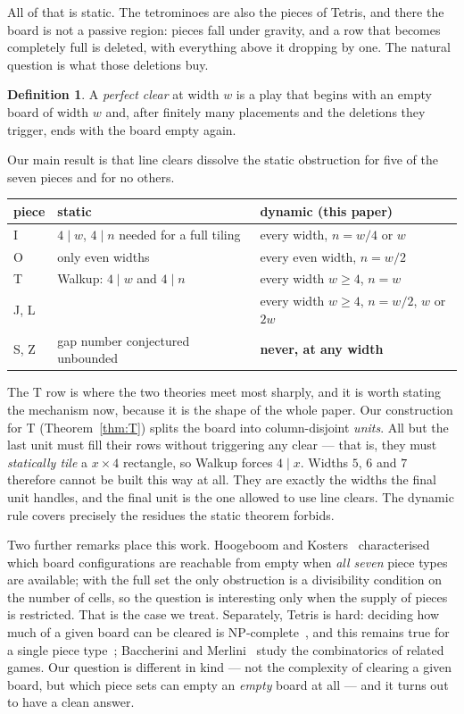 \documentclass[11pt,a4paper]{article}
\theoremstyle{plain}
\theoremstyle{definition}
\newtheorem{definition}[theorem]{Definition}
\theoremstyle{remark}
\begin{document}
All of that is static. The tetrominoes are also the pieces of Tetris, and there the
board is not a passive region: pieces fall under gravity, and a row that becomes
completely full is deleted, with everything above it dropping by one. The natural
question is what those deletions buy.

\begin{definition}
A \emph{perfect clear} at width $w$ is a play that begins with an empty board of
width $w$ and, after finitely many placements and the deletions they trigger, ends
with the board empty again.
\end{definition}

Our main result is that line clears dissolve the static obstruction for five of the
seven pieces and for no others.

\begin{center}
\begin{tabular}{lll}
\toprule
piece & static & dynamic (this paper) \\
\midrule
I & $4 \mid w$, $4 \mid n$ needed for a full tiling & every width, $n = w/4$ or $w$ \\
O & only even widths & every even width, $n = w/2$ \\
T & Walkup: $4 \mid w$ and $4 \mid n$ & every width $w \geq 4$, $n = w$ \\
J, L & & every width $w \geq 4$, $n = w/2$, $w$ or $2w$ \\
S, Z & gap number conjectured unbounded~\cite{hochberg2015} & \textbf{never, at any width} \\
\bottomrule
\end{tabular}
\end{center}

The T row is where the two theories meet most sharply, and it is worth stating the
mechanism now, because it is the shape of the whole paper. Our construction for T
(Theorem~\ref{thm:T}) splits the board into column-disjoint \emph{units}. All but the
last unit must fill their rows without triggering any clear --- that is, they must
\emph{statically tile} a $x \times 4$ rectangle, so Walkup forces $4 \mid x$. Widths
$5$, $6$ and $7$ therefore cannot be built this way at all. They are exactly the
widths the final unit handles, and the final unit is the one allowed to use line
clears. The dynamic rule covers precisely the residues the static theorem forbids.

Two further remarks place this work. Hoogeboom and Kosters~\cite{hoogeboom2004}
characterised which board configurations are reachable from empty when \emph{all
seven} piece types are available; with the full set the only obstruction is a
divisibility condition on the number of cells, so the question is interesting only
when the supply of pieces is restricted. That is the case we treat. Separately,
Tetris is hard: deciding how much of a given board can be cleared is
NP-complete~\cite{demaine2003}, and this remains true for a single piece
type~\cite{mithardness2026}; Baccherini and Merlini~\cite{baccherini2008} study the
combinatorics of related games. Our question is different in kind --- not the complexity
of clearing a given board, but which piece sets can empty an \emph{empty} board at
all --- and it turns out to have a clean answer.
\end{document}
